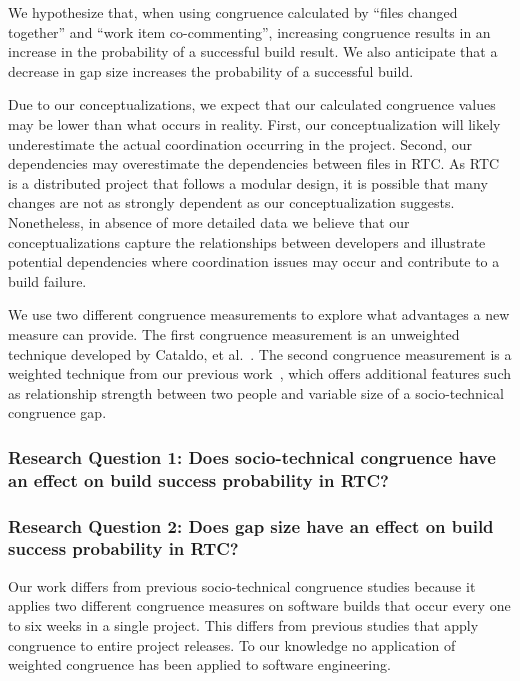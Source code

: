\documentclass[12pt,oneside]{book}
\begin{document}
We hypothesize that, when using congruence calculated by ``files changed together'' and ``work item co-commenting'', increasing congruence results in an increase in the probability of a successful build result. We also anticipate that a decrease in gap size increases the probability of a successful build.

Due to our conceptualizations, we expect that our calculated congruence values may be lower than what occurs in reality. First, our conceptualization will likely underestimate the actual coordination occurring in the project.
Second, our dependencies may overestimate the dependencies between files in RTC.
As RTC is a distributed project that follows a modular design, it is possible that many changes are not as strongly dependent as our conceptualization suggests. Nonetheless, in absence of more detailed data we believe that our conceptualizations capture the relationships between developers and illustrate potential dependencies where coordination issues may occur and contribute to a build failure.

We use two different congruence measurements to explore what advantages a new measure can provide. The first congruence measurement is an unweighted technique developed by Cataldo, et al.~\cite{cataldo:cscw:2006}. The second congruence measurement is a weighted technique from our previous work~\cite{kwan2009:weighted}, which offers additional features such as relationship strength between two people and variable size of a socio-technical congruence gap.

\subsubsection*{Research Question 1: Does socio-technical congruence have an effect on build success probability in RTC?}

\vspace{6pt}

\subsubsection*{Research Question 2: Does gap size have an effect on build success probability in RTC?}

\vspace{6pt}

Our work differs from previous socio-technical congruence studies because it applies two different congruence measures on software builds that occur every one to six weeks in a single project. This differs from previous studies that apply congruence to entire project releases. To our knowledge no application of weighted congruence has been applied to software engineering.
\end{document}
